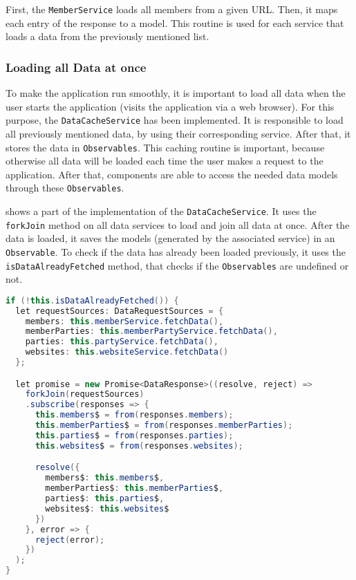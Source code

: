 First, the \texttt{MemberService} loads all members from a given URL. Then, it maps each entry of the response to a model.
This routine is used for each service that loads a data from the previously mentioned list.


\subsubsection{Loading all Data at once}\label{subsubsec:02_impl_data_loadingAll}
To make the application run smoothly, it is important to load all data when the user starts the application (visits the application via a web browser).
For this purpose, the \texttt{DataCacheService} has been implemented. It is responsible to load all previously mentioned data, by using their corresponding service. After that, it stores the data in \texttt{Observables}. This caching routine is important, because otherwise all data will be loaded each time the user makes a request to the application.
After that, components are able to access the needed data models through these \texttt{Observables}.


 shows a part of the implementation of the \texttt{DataCacheService}. It uses the \texttt{forkJoin} method on all data services to load and join all data at once. After the data is loaded, it saves the models (generated by the associated service) in an \texttt{Observable}.
To check if the data has already been loaded previously, it uses the \texttt{isDataAlreadyFetched} method, that checks if the \texttt{Observables} are undefined or not.
\begin{lstlisting}[label=lst:02_impl_data_dataserviceloading, caption=Implementation of fetching all data at once, language=java]
if (!this.isDataAlreadyFetched()) {
  let requestSources: DataRequestSources = {
    members: this.memberService.fetchData(),
    memberParties: this.memberPartyService.fetchData(),
    parties: this.partyService.fetchData(),
    websites: this.websiteService.fetchData()
  };

  let promise = new Promise<DataResponse>((resolve, reject) =>
    forkJoin(requestSources)
    .subscribe(responses => {
      this.members$ = from(responses.members);
      this.memberParties$ = from(responses.memberParties);
      this.parties$ = from(responses.parties);
      this.websites$ = from(responses.websites);

      resolve({
        members$: this.members$,
        memberParties$: this.memberParties$,
        parties$: this.parties$,
        websites$: this.websites$
      })
    }, error => {
      reject(error);
    })
  );
}
\end{lstlisting}


